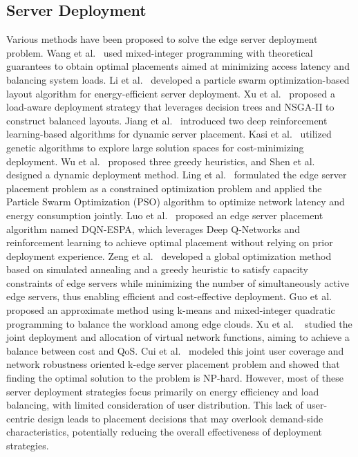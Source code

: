 \documentclass[10pt, conference, letterpaper]{IEEEtran}
\begin{document}
\subsection{Server Deployment}
Various methods have been proposed to solve the edge server deployment problem. Wang et al.~\cite{b1} used mixed-integer programming with theoretical guarantees to obtain optimal placements aimed at minimizing access latency and balancing system loads. Li et al.~\cite{b2} developed a particle swarm optimization-based layout algorithm for energy-efficient server deployment. Xu et al.~\cite{b3} proposed a load-aware deployment strategy that leverages decision trees and NSGA-II to construct balanced layouts. Jiang et al.~\cite{b4} introduced two deep reinforcement learning-based algorithms for dynamic server placement. Kasi et al.~\cite{b5} utilized genetic algorithms to explore large solution spaces for cost-minimizing deployment. Wu et al.~\cite{b6} proposed three greedy heuristics, and Shen et al.~\cite{b7} designed a dynamic deployment method. Ling et al.~\cite{b8} formulated the edge server placement problem as a constrained optimization problem and applied the Particle Swarm Optimization (PSO) algorithm to optimize network latency and energy consumption jointly. Luo et al.~\cite{b9} proposed an edge server placement algorithm named DQN-ESPA, which leverages Deep Q-Networks and reinforcement learning to achieve optimal placement without relying on prior deployment experience. Zeng et al.~\cite{b10} developed a global optimization method based on simulated annealing and a greedy heuristic to satisfy capacity constraints of edge servers while minimizing the number of simultaneously active edge servers, thus enabling efficient and cost-effective deployment. Guo et al.~\cite{b11} proposed an approximate method using k-means and mixed-integer quadratic programming to balance the workload among edge clouds. Xu et al. ~\cite{b12} studied the joint deployment and allocation of virtual network functions, aiming to achieve a balance between cost and QoS. Cui et al.~\cite{b13} modeled this joint user coverage and network robustness oriented k-edge server placement problem and showed that finding the optimal solution to the problem is NP-hard. However, most of these server deployment strategies focus primarily on energy efficiency and load balancing, with limited consideration of user distribution. This lack of user-centric design leads to placement decisions that may overlook demand-side characteristics, potentially reducing the overall effectiveness of deployment strategies.
\end{document}
